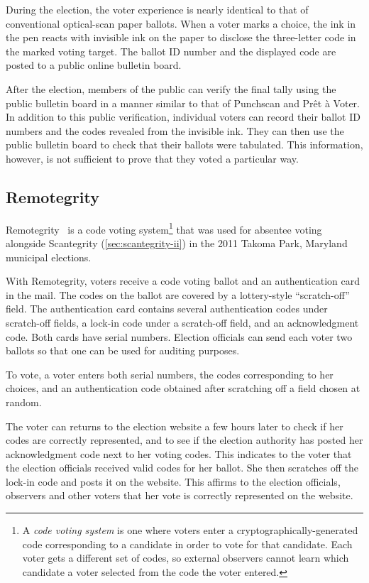 During the election, the voter experience is nearly identical to that
of conventional optical-scan paper ballots. When a voter marks a
choice, the ink in the pen reacts with invisible ink on the paper to
disclose the three-letter code in the marked voting target. The ballot
ID number and the displayed code are posted to a public
online bulletin board.

After the election, members of the public can verify the final tally
using the public bulletin board in a manner similar to that of
Punchscan and Prêt à Voter. In addition to this public verification,
individual voters can record their ballot ID numbers and the codes
revealed from the invisible ink. They can then use the public bulletin
board to check that their ballots were tabulated. This information,
however, is not sufficient to prove that they voted a particular way.

\subsection{Remotegrity}
\label{sec:remotegrity}
Remotegrity~\cite{zagorski2013} is a code voting system\footnote{A
  \emph{code voting system} is one where voters enter a
  cryptographically-generated code corresponding to a candidate in
  order to vote for that candidate. Each voter gets a different set of
  codes, so external observers cannot learn which candidate a voter
  selected from the code the voter entered.} that was used for absentee voting alongside Scantegrity
(\autoref{sec:scantegrity-ii}) in the 2011 Takoma Park, Maryland
municipal elections.

With Remotegrity, voters receive a code voting ballot and an
authentication card in the mail. The codes on the ballot are covered
by a lottery-style ``scratch-off'' field. The authentication card
contains several authentication codes under scratch-off fields, a
lock-in code under a scratch-off field, and an acknowledgment
code. Both cards have serial numbers. Election officials can send each
voter two ballots so that one can be used for auditing purposes.

To vote, a voter enters both serial numbers, the codes corresponding
to her choices, and an authentication code obtained after scratching
off a field chosen at random.

The voter can returns to the election website a few hours later to
check if her codes are correctly represented, and to see if the
election authority has posted her acknowledgment code next to her
voting codes. This indicates to the voter that the election officials
received valid codes for her ballot. She then scratches off the
lock-in code and posts it on the website. This affirms to the election
officials, observers and other voters that her vote is correctly
represented on the website.

